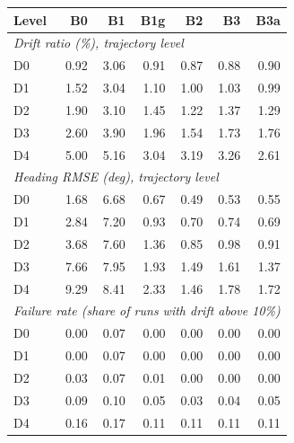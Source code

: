 \begin{tabular}{lrrrrrr}
\toprule
Level & B0 & B1 & B1g & B2 & B3 & B3a \\
\midrule
\multicolumn{7}{l}{\emph{Drift ratio (\%), trajectory level}} \\
D0 & 0.92 & 3.06 & 0.91 & 0.87 & 0.88 & 0.90 \\
D1 & 1.52 & 3.04 & 1.10 & 1.00 & 1.03 & 0.99 \\
D2 & 1.90 & 3.10 & 1.45 & 1.22 & 1.37 & 1.29 \\
D3 & 2.60 & 3.90 & 1.96 & 1.54 & 1.73 & 1.76 \\
D4 & 5.00 & 5.16 & 3.04 & 3.19 & 3.26 & 2.61 \\
\midrule
\multicolumn{7}{l}{\emph{Heading RMSE (deg), trajectory level}} \\
D0 & 1.68 & 6.68 & 0.67 & 0.49 & 0.53 & 0.55 \\
D1 & 2.84 & 7.20 & 0.93 & 0.70 & 0.74 & 0.69 \\
D2 & 3.68 & 7.60 & 1.36 & 0.85 & 0.98 & 0.91 \\
D3 & 7.66 & 7.95 & 1.93 & 1.49 & 1.61 & 1.37 \\
D4 & 9.29 & 8.41 & 2.33 & 1.46 & 1.78 & 1.72 \\
\midrule
\multicolumn{7}{l}{\emph{Failure rate (share of runs with drift above 10\%)}} \\
D0 & 0.00 & 0.07 & 0.00 & 0.00 & 0.00 & 0.00 \\
D1 & 0.00 & 0.07 & 0.00 & 0.00 & 0.00 & 0.00 \\
D2 & 0.03 & 0.07 & 0.01 & 0.00 & 0.00 & 0.00 \\
D3 & 0.09 & 0.10 & 0.05 & 0.03 & 0.04 & 0.05 \\
D4 & 0.16 & 0.17 & 0.11 & 0.11 & 0.11 & 0.11 \\
\bottomrule
\end{tabular}